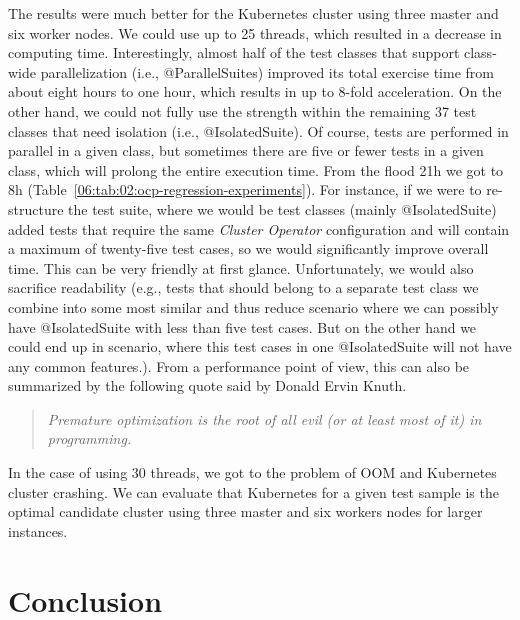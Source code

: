 The results were much better for the Kubernetes cluster using three master and six worker nodes.
We could use up to 25 threads, which resulted in a decrease in computing time.
Interestingly, almost half of the test classes that support class-wide parallelization (i.e., @ParallelSuites)
improved its total exercise time from about eight hours to one hour, which results in up to 8-fold acceleration.
On the other hand, we could not fully use the strength within the remaining 37 test classes that need isolation (i.e., @IsolatedSuite).
Of course, tests are performed in parallel in a given class, but sometimes there are five or fewer tests in a given class, which
will prolong the entire execution time.
From the flood 21h we got to 8h (Table~\ref{06:tab:02:ocp-regression-experiments}).
For instance, if we were to re-structure the test suite, where we would be test classes (mainly @IsolatedSuite)
added tests that require the same \emph{Cluster Operator} configuration and will contain a maximum of twenty-five test cases,
so we would significantly improve overall time.
This can be very friendly at first glance.
Unfortunately, we would also sacrifice readability (e.g., tests that should belong to a separate test class we combine
into some most similar and thus reduce scenario where we can possibly have @IsolatedSuite with less than five test cases.
But on the other hand we could end up in scenario, where this test cases in one @IsolatedSuite will not have any common features.).
From a performance point of view, this can also be summarized by the following quote said by Donald Ervin Knuth.
\begin{quote}
    \textit{Premature optimization is the root of all evil (or at least most of it) in programming.}
\end{quote}

In the case of using 30 threads, we got to the problem of OOM and Kubernetes cluster crashing.
We can evaluate that Kubernetes for a given test sample is the optimal candidate
cluster using three master and six workers nodes for larger instances.

\chapter{Conclusion}
\label{08:chapter:title}

